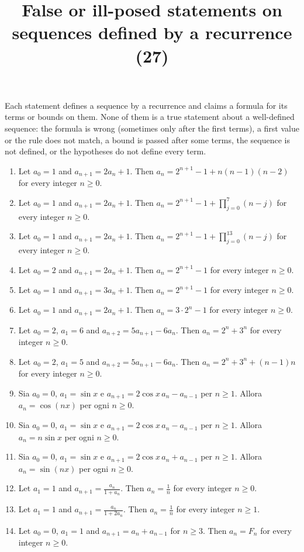 \documentclass[11pt,a4paper]{article}
\title{False or ill-posed statements on sequences defined by a recurrence (27)}
\author{}
\date{}
\begin{document}
\maketitle
Each statement defines a sequence by a recurrence and claims a formula for its terms or bounds on them. None of them is a true statement about a well-defined sequence: the formula is wrong (sometimes only after the first terms), a first value or the rule does not match, a bound is passed after some terms, the sequence is not defined, or the hypotheses do not define every term.

\begin{enumerate}
\item Let $a_0=1$ and $a_{n+1}=2a_n+1$. Then $a_n=2^{n+1}-1+n\left(n-1\right)\left(n-2\right)$ for every integer $n\ge0$.
\item Let $a_0=1$ and $a_{n+1}=2a_n+1$. Then $a_n=2^{n+1}-1+\prod_{j=0}^{7}\left(n-j\right)$ for every integer $n\ge0$.
\item Let $a_0=1$ and $a_{n+1}=2a_n+1$. Then $a_n=2^{n+1}-1+\prod_{j=0}^{13}\left(n-j\right)$ for every integer $n\ge0$.
\item Let $a_0=2$ and $a_{n+1}=2a_n+1$. Then $a_n=2^{n+1}-1$ for every integer $n\ge0$.
\item Let $a_0=1$ and $a_{n+1}=3a_n+1$. Then $a_n=2^{n+1}-1$ for every integer $n\ge0$.
\item Let $a_0=1$ and $a_{n+1}=2a_n+1$. Then $a_n=3\cdot2^{n}-1$ for every integer $n\ge0$.
\item Let $a_0=2$, $a_1=6$ and $a_{n+2}=5a_{n+1}-6a_n$. Then $a_n=2^n+3^n$ for every integer $n\ge0$.
\item Let $a_0=2$, $a_1=5$ and $a_{n+2}=5a_{n+1}-6a_n$. Then $a_n=2^n+3^n+\left(n-1\right)n$ for every integer $n\ge0$.
\item Sia $a_0=0$, $a_1=\sin x$ e $a_{n+1}=2\cos x\,a_n-a_{n-1}$ per $n\ge1$. Allora $a_n=\cos(nx)$ per ogni $n\ge0$.
\item Sia $a_0=0$, $a_1=\sin x$ e $a_{n+1}=2\cos x\,a_n-a_{n-1}$ per $n\ge1$. Allora $a_n=n\sin x$ per ogni $n\ge0$.
\item Sia $a_0=0$, $a_1=\sin x$ e $a_{n+1}=2\cos x\,a_n+a_{n-1}$ per $n\ge1$. Allora $a_n=\sin(nx)$ per ogni $n\ge0$.
\item Let $a_1=1$ and $a_{n+1}=\frac{a_n}{1+a_n}$. Then $a_n=\frac{1}{n}$ for every integer $n\ge0$.
\item Let $a_1=1$ and $a_{n+1}=\frac{a_n}{1+2a_n}$. Then $a_n=\frac{1}{n}$ for every integer $n\ge1$.
\item Let $a_0=0$, $a_1=1$ and $a_{n+1}=a_n+a_{n-1}$ for $n\ge3$. Then $a_n=F_n$ for every integer $n\ge0$.

\end{enumerate}
\end{document}
